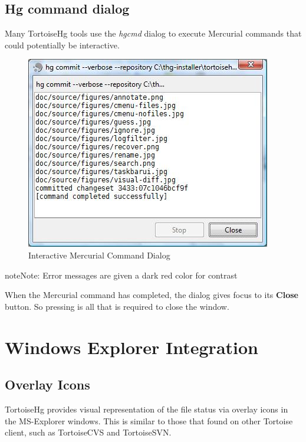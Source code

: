 \documentclass[letterpaper,10pt,english]{manual}
\begin{document}
\subsection{Hg command dialog}

Many TortoiseHg tools use the \emph{hgcmd} dialog to execute Mercurial
commands that could potentially be interactive.
\begin{figure}[htbp]
\centering

\includegraphics{hgcmd.jpg}
\caption{Interactive Mercurial Command Dialog}\end{figure}

\begin{notice}{note}{Note:}
Error messages are given a dark red color for contrast
\end{notice}

When the Mercurial command has completed, the dialog gives focus to its
\textbf{Close} button.  So pressing  is all that is
required to close the window.

\resetcurrentobjects
\hypertarget{--doc-explorer}{}

\section{Windows Explorer Integration}
\hypertarget{module-explorer}{}

\subsection{Overlay Icons}

TortoiseHg provides visual representation of the file status via overlay
icons in the MS-Explorer windows. This is similar to those that found on
other Tortoise client, such as TortoiseCVS and TortoiseSVN.
\end{document}
